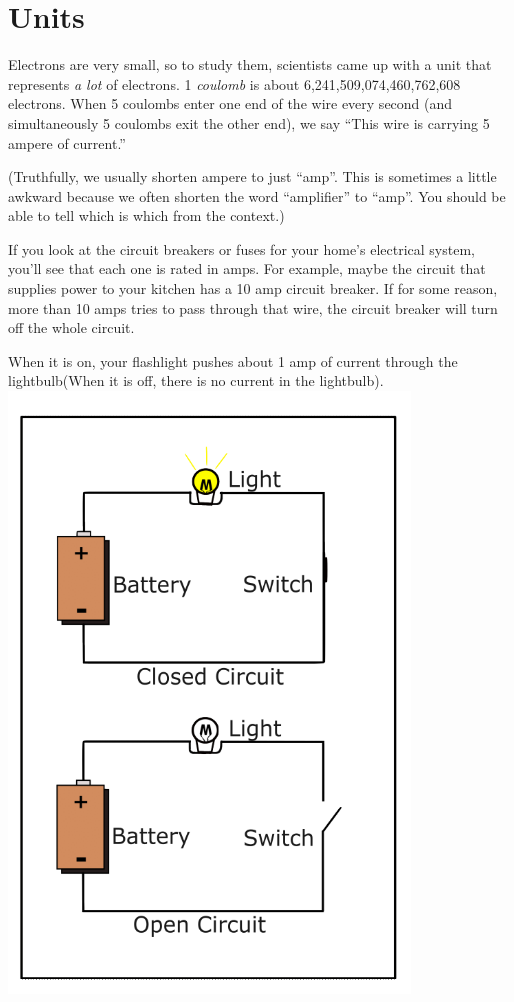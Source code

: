 \section{Units}

Electrons are very small, so to study them, scientists came up with a
unit that represents \textit{a lot} of electrons. 1 \textit{coulomb}
is about 6,241,509,074,460,762,608 electrons.  When 5 coulombs enter one end of the wire every second (and simultaneously 5 coulombs exit the other end), we say ``This wire is carrying 5 ampere of current.''

(Truthfully, we usually shorten ampere to just ``amp''.  This is
sometimes a little awkward because we often shorten the word
``amplifier'' to ``amp''. You should be able to tell which is which
from the context.)

If you look at the circuit breakers or fuses for your home's
electrical system, you'll see that each one is rated in amps.  For
example, maybe the circuit that supplies power to your kitchen has a 10
amp circuit breaker. If for some reason, more than 10 amps tries to
pass through that wire, the circuit breaker will turn off the whole
circuit.

When it is on, your flashlight pushes about 1 amp of current
through the lightbulb(When it is off, there is no current in the
lightbulb).
\includegraphics[width=0.8\textwidth]{Circuit_OnOff.png}

